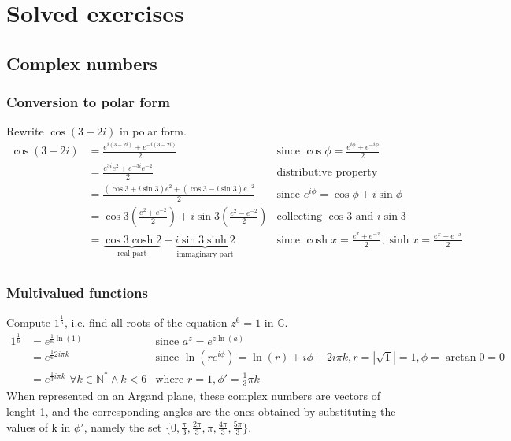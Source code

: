 \chapter{Solved exercises}

\section{Complex numbers}

  \subsection{Conversion to polar form}
  Rewrite $\cos(3-2i)$ in polar form.
  \begin{align*}
    \cos(3-2i) & = \frac{e^{i(3-2i)} + e^{-i(3-2i)}}{2}
               & \text{since }\cos\phi = \frac{e^{i\phi} + e^{-i\phi}}{2} \\
               & = \frac{e^{3i}e^{2} + e^{-3i}e^{-2}}{2}
               & \text{distributive property} \\
               & = \frac{(\cos3 + i\sin3)e^{2} + (\cos3 - i\sin3)e^{-2}}{2}
               & \text{since } e^{i\phi} = \cos\phi + i\sin\phi \\
               & = \cos3\left(\frac{e^2+e^{-2}}{2}\right) + i\sin3\left(\frac{e^2-e^{-2}}{2}\right)
               & \text{collecting } \cos3 \text{ and } i\sin3 \\
               & = \underbrace{\cos3\cosh2}_{\text{real part}} + \underbrace{i\sin3\sinh2}_{\text{immaginary part}}
               & \text{since } \cosh x = \frac{e^x+e^{-x}}{2}, \sinh x = \frac{e^x-e^{-x}}{2} \\
  \end{align*}

  \subsection{Multivalued functions}
  Compute $1^{\frac{1}{6}}$, i.e. find all roots of the equation $z^{6} = 1$ in $\mathbb{C}$.
  \begin{align*}
    1^{\frac{1}{6}} & = e^{\frac{1}{6}\ln(1)}
                    & \text{since } a^z = e^{z\ln(a)}\\
                    & = e^{\frac{1}{6}2i\pi k}
                    & \text{since } \ln(re^{i\phi}) = \ln(r) + i\phi + 2i\pi k, 
                                    r = |\sqrt1| = 1, 
                                    \phi = \arctan{0} = 0\\
                    & = e^{\frac{1}{3}i\pi k} \,\,\forall k \in \mathbb{N}^* \wedge k < 6
                    & \text{where } r = 1, \phi' = \frac{1}{3} \pi k
  \end{align*}
  When represented on an Argand plane, these complex numbers are vectors of lenght 1, and the corresponding angles are the ones obtained by substituting the values of k in $\phi'$, namely the set $\{0, \frac{\pi}{3}, \frac{2\pi}{3}, \pi, \frac{4\pi}{3}, \frac{5\pi}{3}\}$.

